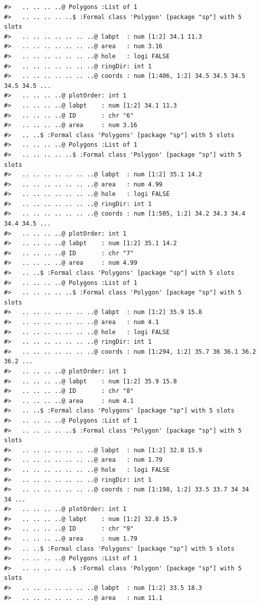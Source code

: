 \documentclass[12pt,a4paper,a4paper]{book}
\theoremstyle{definition}
\theoremstyle{definition}
\theoremstyle{definition}
\theoremstyle{remark}
\begin{document}
\begin{verbatim}
#>   .. .. .. ..@ Polygons :List of 1
#>   .. .. .. .. ..$ :Formal class 'Polygon' [package "sp"] with 5 slots
#>   .. .. .. .. .. .. ..@ labpt  : num [1:2] 34.1 11.3
#>   .. .. .. .. .. .. ..@ area   : num 3.16
#>   .. .. .. .. .. .. ..@ hole   : logi FALSE
#>   .. .. .. .. .. .. ..@ ringDir: int 1
#>   .. .. .. .. .. .. ..@ coords : num [1:406, 1:2] 34.5 34.5 34.5 34.5 34.5 ...
#>   .. .. .. ..@ plotOrder: int 1
#>   .. .. .. ..@ labpt    : num [1:2] 34.1 11.3
#>   .. .. .. ..@ ID       : chr "6"
#>   .. .. .. ..@ area     : num 3.16
#>   .. ..$ :Formal class 'Polygons' [package "sp"] with 5 slots
#>   .. .. .. ..@ Polygons :List of 1
#>   .. .. .. .. ..$ :Formal class 'Polygon' [package "sp"] with 5 slots
#>   .. .. .. .. .. .. ..@ labpt  : num [1:2] 35.1 14.2
#>   .. .. .. .. .. .. ..@ area   : num 4.99
#>   .. .. .. .. .. .. ..@ hole   : logi FALSE
#>   .. .. .. .. .. .. ..@ ringDir: int 1
#>   .. .. .. .. .. .. ..@ coords : num [1:505, 1:2] 34.2 34.3 34.4 34.4 34.5 ...
#>   .. .. .. ..@ plotOrder: int 1
#>   .. .. .. ..@ labpt    : num [1:2] 35.1 14.2
#>   .. .. .. ..@ ID       : chr "7"
#>   .. .. .. ..@ area     : num 4.99
#>   .. ..$ :Formal class 'Polygons' [package "sp"] with 5 slots
#>   .. .. .. ..@ Polygons :List of 1
#>   .. .. .. .. ..$ :Formal class 'Polygon' [package "sp"] with 5 slots
#>   .. .. .. .. .. .. ..@ labpt  : num [1:2] 35.9 15.8
#>   .. .. .. .. .. .. ..@ area   : num 4.1
#>   .. .. .. .. .. .. ..@ hole   : logi FALSE
#>   .. .. .. .. .. .. ..@ ringDir: int 1
#>   .. .. .. .. .. .. ..@ coords : num [1:294, 1:2] 35.7 36 36.1 36.2 36.2 ...
#>   .. .. .. ..@ plotOrder: int 1
#>   .. .. .. ..@ labpt    : num [1:2] 35.9 15.8
#>   .. .. .. ..@ ID       : chr "8"
#>   .. .. .. ..@ area     : num 4.1
#>   .. ..$ :Formal class 'Polygons' [package "sp"] with 5 slots
#>   .. .. .. ..@ Polygons :List of 1
#>   .. .. .. .. ..$ :Formal class 'Polygon' [package "sp"] with 5 slots
#>   .. .. .. .. .. .. ..@ labpt  : num [1:2] 32.8 15.9
#>   .. .. .. .. .. .. ..@ area   : num 1.79
#>   .. .. .. .. .. .. ..@ hole   : logi FALSE
#>   .. .. .. .. .. .. ..@ ringDir: int 1
#>   .. .. .. .. .. .. ..@ coords : num [1:198, 1:2] 33.5 33.7 34 34 34 ...
#>   .. .. .. ..@ plotOrder: int 1
#>   .. .. .. ..@ labpt    : num [1:2] 32.8 15.9
#>   .. .. .. ..@ ID       : chr "9"
#>   .. .. .. ..@ area     : num 1.79
#>   .. ..$ :Formal class 'Polygons' [package "sp"] with 5 slots
#>   .. .. .. ..@ Polygons :List of 1
#>   .. .. .. .. ..$ :Formal class 'Polygon' [package "sp"] with 5 slots
#>   .. .. .. .. .. .. ..@ labpt  : num [1:2] 33.5 18.3
#>   .. .. .. .. .. .. ..@ area   : num 11.1

\end{verbatim}
\end{document}
